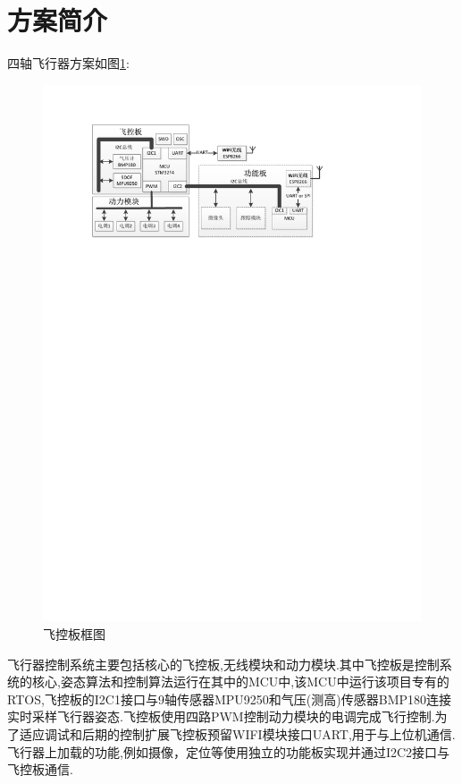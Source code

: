 \documentclass[10pt,a4paper]{article}
\begin{document}
\section{方案简介} 
四轴飞行器方案如图\ref{飞控板框图}:
\begin{figure}[!hbp]
    \begin{center}
        \includegraphics[width=12cm]{../fig/飞控板框图.pdf}
        \caption{飞控板框图}\label{飞控板框图}
    \end{center}
\end{figure}

飞行器控制系统主要包括核心的飞控板,无线模块和动力模块.其中飞控板是控制系统的核心,姿态算法和控制算法运行在其中的MCU中,该MCU中运行该项目专有的RTOS,飞控板的I2C1接口与9轴传感器MPU9250和气压(测高)传感器BMP180连接实时采样飞行器姿态.飞控板使用四路PWM控制动力模块的电调完成飞行控制.为了适应调试和后期的控制扩展飞控板预留WIFI模块接口UART,用于与上位机通信.飞行器上加载的功能,例如摄像，定位等使用独立的功能板实现并通过I2C2接口与飞控板通信.
\end{document}
